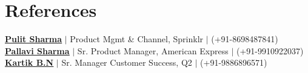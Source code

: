 \documentclass[a4paper,10pt]{article}
\begin{document}
\section{References}
\begin{itemize}[leftmargin=0.15in, label={}]
  \small{\item{
    \href{https://linkedin.com/in/pulit-sharma-36426349}{\textbf{\underline{Pulit Sharma}}} $|$ Product Mgmt \& Channel, Sprinklr $|$ (+91-8698487841) \\
    \href{https://linkedin.com/in/pallavi-sharma-54088159}{\textbf{\underline{Pallavi Sharma}}} $|$ Sr. Product Manager, American Express $|$ (+91-9910922037) \\
    \href{https://linkedin.com/in/kartik-bn-3770807b}{\textbf{\underline{Kartik B.N}}} $|$ Sr. Manager Customer Success, Q2 $|$ (+91-9886896571)
  }}
\end{itemize}
\end{document}
